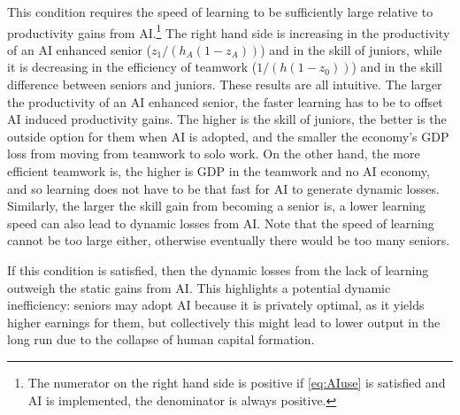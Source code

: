 \documentclass[12pt]{article}
\begin{document}
{%
This condition requires the speed of learning to be sufficiently large relative to productivity gains from AI.\footnote{The numerator on the right hand side is positive if \eqref{eq:AIuse} is satisfied and AI is implemented, the denominator is always positive.} The right hand side is increasing in the productivity of an AI enhanced senior ($z_1/(h_A(1-z_A))$) and in the skill of juniors, while it is decreasing in the efficiency of teamwork ($1/(h(1-z_0))$) and in the skill difference between seniors and juniors. These results are all intuitive. The larger the productivity of an AI enhanced senior, the faster learning has to be to offset AI induced productivity gains. The higher is the skill of juniors, the better is the outside option for them when AI is adopted, and the smaller the economy's GDP loss from moving from teamwork to solo work. On the other hand, the more efficient teamwork is, the higher is GDP in the teamwork and no AI economy, and so learning does not have to be that fast for AI to generate dynamic losses. Similarly, the larger the skill gain from becoming a senior is, a lower learning speed can also lead to dynamic losses from AI. Note that the speed of learning cannot be too large either, otherwise eventually there would be too many seniors. 



If this condition is satisfied, then the dynamic losses from the lack of learning outweigh the static gains from AI. This highlights a potential dynamic inefficiency: seniors may adopt AI because it is privately optimal, as it yields higher earnings for them, but collectively this might lead to lower output in the long run due to the collapse of human capital formation. 


}
\end{document}
